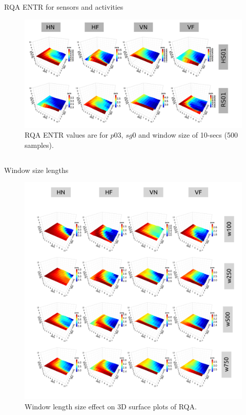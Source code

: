 {

\begin{frame}{RQA ENTR for sensors and activities
}
    \begin{figure}
        \includegraphics[width=0.75\linewidth]{./figs/results/rqa-epsilons-sensors-activities/versions/drawing-v00}{}
	\caption{
	RQA ENTR values are for
	$p03$, $sg0$ and window size of 10-secs (500 samples).
} 
   \end{figure}
	
\end{frame}
}







\subsection{}
{

\begin{frame}{Window size lengths
}
   \begin{figure}
        \includegraphics[width=0.55\linewidth]{./figs/results/3d-rqa-epsilons-windows/versions/drawing-v00}{}
	\caption{Window length size effect on 3D surface plots of RQA.} 
   \end{figure}
	
\end{frame}
}









